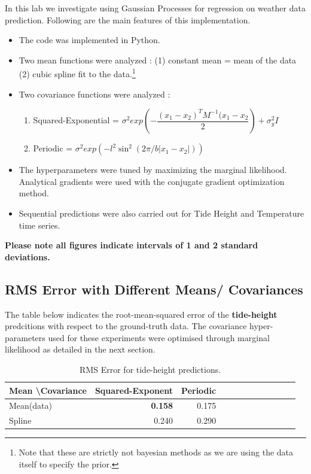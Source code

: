 \documentclass[11pt]{report}
\begin{document}
In this lab we investigate using Gaussian Processes for regression on weather data prediction. Following are the main features of this implementation.
\begin{itemize}
    \item The code was implemented in Python.
    \item Two mean functions were analyzed : (1) constant mean = mean of the data (2) cubic spline fit to the data.\footnote{ Note that these are strictly not bayesian methods as we are using the data itself to specify the prior.}
    \item Two covariance functions were analyzed :
        \begin{enumerate}
        \item Squared-Exponential = $\sigma^2 exp\left(-\dfrac{(x_1-x_2)^TM^{-1}(x_1-x_2}{2}\right) + \sigma_y^2I$
        \item Periodic  = $\sigma^2 exp\left(-l^2\sin^2(2\pi/b|x_1-x_2|)\right)$
        \end{enumerate}
        \item The hyperparameters were tuned by maximizing the marginal likelihood. Analytical gradients were used with the conjugate gradient optimization method.
        \item Sequential predictions were also carried out for Tide Height and Temperature time series.
\end{itemize}
\textbf{Please note all figures indicate intervals of 1 and 2 standard deviations.}
\subsection*{RMS Error with Different Means/ Covariances}
The table below indicates the root-mean-squared error of the \textbf{tide-height} predcitions with respect to the ground-truth data. The covariance hyper-parameters used for these experiments were optimised through marginal likelihood as detailed in the next section.

\begin{table}[h]
\begin{center}
\begin{tabular}{|l||r|r|r|r|r|r|r|r|r|r|r|}
\hline
Mean \textbackslash Covariance & Squared-Exponent & Periodic\\\hline\hline
Mean(data) & \textbf{0.158} &   0.175 \\\hline
Spline     & 0.240 &   0.290 \\\hline
\end{tabular}
\caption{RMS Error for tide-height predictions.}
\label{tab1}
\end{center}
\end{table}
\end{document}
